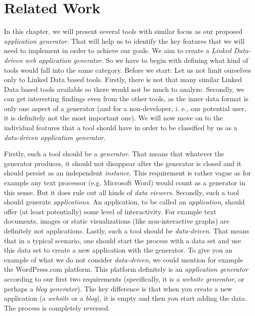 \chapter{Related Work}

In this chapter, we will present several tools with similar focus as our proposed \emph{application generator}. That will help us to identify the key features that we will need to implement in order to achieve our goals. We aim to create a \emph{Linked Data-driven web application generator}. So we have to begin with defining what kind of tools would fall into the same category. Before we start: Let us not limit ourselves only to Linked Data based tools. Firstly, there is not that many similar Linked Data based tools available so there would not be much to analyze. Secondly, we can get interesting findings even from the other tools, as the inner data format is only one aspect of a generator (and for a non-developer, i. e., our potential user, it is definitely not the most important one). We will now move on to the individual features that a tool should have in order to be classified by us as a \emph{data-driven application generator}.

Firstly, such a tool should be a \emph{generator}. That means that whatever the generator produces, it should not disappear after the generator is closed and it should persist as an independent \emph{instance}. This requirement is rather vague as for example any text processor (e.g. Microsoft Word) would count as a generator in this sense. But it does rule out all kinds of \emph{data viewers}. Secondly, such a tool should generate \emph{applications}. An application, to be called an \emph{application}, should offer (at least potentially) some level of interactivity. For example text documents, images or static visualizations (like non-interactive graphs) are definitely not applications. Lastly, such a tool should be \emph{data-driven}. That means that in a typical scenario, one should start the process with a data set and use this data set to create a new application with the generator.  To give you an example of what we do not consider \emph{data-driven}, we could mention for example the WordPress.com \cite{wordpress} platform. This platform definitely is an \emph{application generator} according to our first two requirements (specifically, it is a \emph{website generator}, or perhaps a \emph{blog generator}). The key difference is that when you create a new application (a \emph{website} or a \emph{blog}), it is empty and then you start adding the data. The process is completely reversed.

